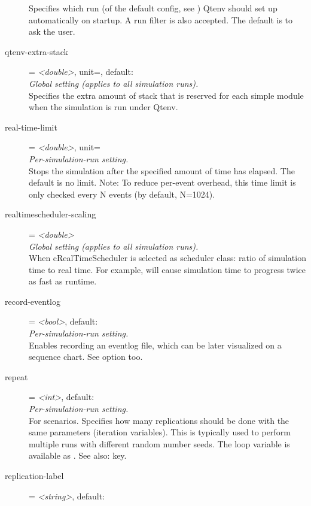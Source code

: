 \begin{description}
    Specifies which run (of the default config, see
    ) Qtenv should set up
    automatically on startup. A run filter is also accepted. The default is to
    ask the user.
\item[qtenv-extra-stack] = \textit{<double>}, unit=, default: \\
    \textit{Global setting (applies to all simulation runs).}\\
    Specifies the extra amount of stack that is reserved for each
     simple module when the simulation is run under Qtenv.
\item[real-time-limit] = \textit{<double>}, unit=\\
    \textit{Per-simulation-run setting.}\\
    Stops the simulation after the specified amount of time has elapsed. The
    default is no limit. Note: To reduce per-event overhead, this time limit is
    only checked every N events (by default, N=1024).
\item[realtimescheduler-scaling] = \textit{<double>}\\
    \textit{Global setting (applies to all simulation runs).}\\
    When cRealTimeScheduler is selected as scheduler class: ratio of simulation
    time to real time. For example,
     will cause
    simulation time to progress twice as fast as runtime.
\item[record-eventlog] = \textit{<bool>}, default: \\
    \textit{Per-simulation-run setting.}\\
    Enables recording an eventlog file, which can be later visualized on a
    sequence chart. See  option too.
\item[repeat] = \textit{<int>}, default: \\
    \textit{Per-simulation-run setting.}\\
    For scenarios. Specifies how many replications should be done with the same
    parameters (iteration variables). This is typically used to perform
    multiple runs with different random number seeds. The loop variable is
    available as . See also:
     key.
\item[replication-label] = \textit{<string>}, default: \\

\end{description}
